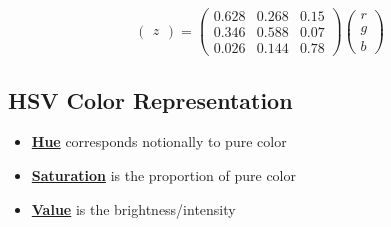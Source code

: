\documentclass[twocolumn,landscape,10pt]{article}
\theoremstyle{definition}
\begin{document}
\begin{itemize}
\[\begin{pmatrix}
                z
            \end{pmatrix} 
            =
            \begin{pmatrix}
                0.628 & 0.268 & 0.15 \\
                0.346 & 0.588 & 0.07 \\
                0.026 & 0.144 & 0.78
            \end{pmatrix} 
            \begin{pmatrix}
                r \\
                g \\
                b
            \end{pmatrix} 
        \]
\end{itemize} 

\subsection{HSV Color Representation}

\begin{itemize}
    \item \underline{\textbf{Hue}} corresponds notionally to pure color
    \item \underline{\textbf{Saturation}} is the proportion of pure color
    \item \underline{\textbf{Value}} is the brightness/intensity
\end{itemize} 
\end{document}
